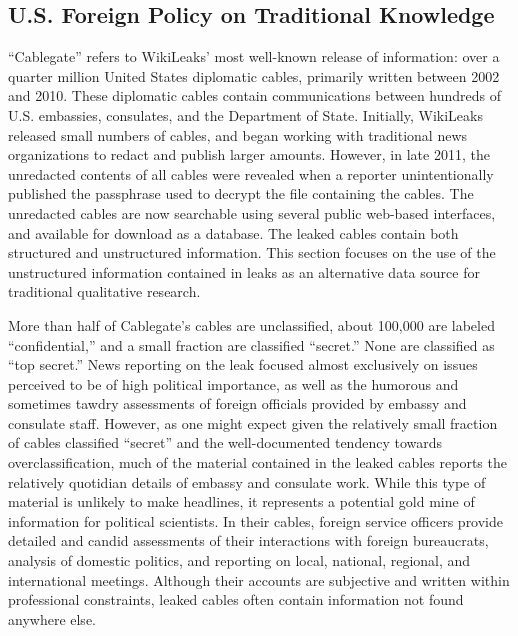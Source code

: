 \documentclass[12pt]{article}
\begin{document}
\subsection*{U.S. Foreign Policy on Traditional Knowledge}
\label{tk}

``Cablegate'' refers to WikiLeaks' most well-known release of information: over a quarter million 
United States diplomatic cables, primarily written between 2002 and 2010. These diplomatic cables 
contain communications between hundreds of U.S. embassies, consulates, and the Department of State. 
Initially, WikiLeaks released small numbers of cables, and began working with traditional news 
organizations to redact and publish larger amounts. However, in late 2011, the unredacted 
contents of all cables were revealed when a reporter unintentionally published the passphrase used 
to decrypt the file containing the cables. The unredacted cables are now searchable 
using several public web-based interfaces, and available for download as a database. 
The leaked cables contain both structured and unstructured information. 
This section focuses on the use of the unstructured information contained in leaks as an alternative 
data source for traditional qualitative research.

More than half of Cablegate's cables are unclassified, about 100,000 are labeled ``confidential,'' 
and a small 
fraction are classified ``secret.'' None are classified as ``top secret.'' News reporting on the leak 
focused almost exclusively on issues perceived to be of high political importance, as well as 
the humorous and sometimes tawdry assessments of foreign officials provided by embassy and consulate 
staff. However, as one might expect given the relatively small fraction of cables classified ``secret'' 
and 
the well-documented tendency towards overclassification, much of the material 
contained in the leaked cables reports the relatively quotidian details of embassy and consulate 
work. 
While this type of material is unlikely to make headlines, it represents a potential gold mine 
of information for political scientists. In their cables, foreign service officers provide detailed 
and candid assessments of their interactions with foreign bureaucrats, analysis of domestic politics, 
and reporting on local, national, regional, and international meetings. Although their accounts are 
subjective and written within professional constraints, leaked cables often contain information 
not found anywhere else.
\end{document}

